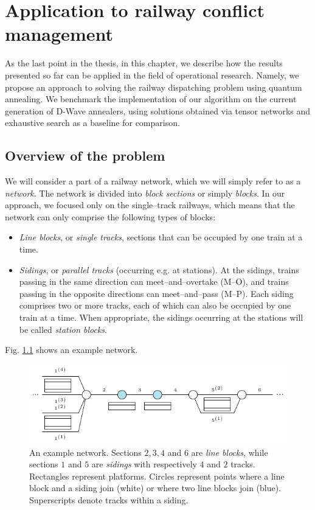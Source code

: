 \chapter[Railway conflict management]{Application to railway conflict management}
\label{chapter:trains}
As the last point in the thesis, in this chapter, we describe how the results
presented so far can be applied in the field of operational research. Namely,
we propose an approach to solving the railway dispatching problem using quantum
annealing. We benchmark the implementation of our algorithm on the current
generation of D-Wave annealers, using solutions obtained via tensor networks
and exhaustive search as a baseline for comparison.

\section{Overview of the problem}
We will consider a part of a railway network, which we will simply refer to as
a \emph{network}. The network is divided into \emph{block sections} or simply
\emph{blocks}. In our approach, we focused only on the single--track railways,
which means that the network can only comprise the following types of blocks:
\begin{itemize}
  \item \emph{Line blocks}, or \emph{single tracks}, sections that can be occupied by one train
    at a time.
  \item \emph{Sidings}, or \emph{parallel tracks} (occurring e.g. at stations). At the sidings,
    trains passing in the same direction can meet--and--overtake (M--O), and trains passing
    in the opposite directions can meet--and--pass (M--P). Each siding comprises two or more
    tracks, each of which can also be occupied by one train at a time. When appropriate, the
    sidings occurring at the stations will be called \emph{station blocks}.
\end{itemize}
Fig. \ref{fig:railway-network} shows an example network.

\begin{figure}[ht]
  \includegraphics[width=\textwidth]{figures/example_line}
  \caption{
    An example network. Sections $2, 3, 4$ and $6$ are \emph{line blocks}, while
    sections $1$ and $5$ are \emph{sidings} with respectively $4$ and $2$ tracks.
    Rectangles represent platforms. Circles represent points where a line block and
    a siding join (white) or where two line blocks join (blue). Superscripts denote
    tracks within a siding. } \label{fig:railway-network}
\end{figure}

